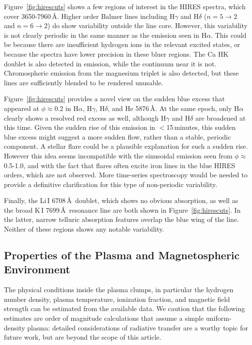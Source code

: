 \documentclass{nature3}
\begin{document}
\begin{methods}
Figure~\ref{fig:hirescuts} shows a few regions of interest in the
HIRES spectra, which cover 3650-7960\,\AA.  Higher order Balmer lines
including H$\gamma$ and H$\delta$ ($n=5\rightarrow2$ and
$n=6\rightarrow2$) do show variability outside the line core.
However, this variability is not clearly periodic in the same manner
as the emission seen in H$\alpha$.  This could be because there are
insufficient hydrogen ions in the relevant excited states, or because
the spectra have lower precision in these bluer regions.  The Ca HK
doublet is also detected in emission, while the continuum near it is
not.  Chromospheric emission from the magnesium triplet is also
detected, but these lines are sufficiently blended to be rendered
unusable.

Figure~\ref{fig:hirescuts} provides a novel view on the sudden blue
excess that appeared at $\phi$$\approx$0.2 in H$\alpha$, H$\gamma$,
H$\delta$, and He 5876\,\AA.  At the same epoch, only H$\alpha$
clearly shows a resolved red excess as well, although H$\gamma$ and
H$\delta$ are broadened at this time.  Given the sudden rise of this
emission in $<$15\,minutes, this sudden blue excess might suggest a
more sudden flow, rather than a stable, periodic component.  A stellar
flare could be a plausible explanation for such a sudden rise.
However this idea seems incompatible with the sinusoidal emission seen
from $\phi$$\approx$0.5-1.0, and with the fact that flares often
excite iron lines in the blue HIRES orders, which are not observed.
More time-series spectroscopy would be needed to provide a definitive
clarification for this type of non-periodic variability.

Finally, the Li\,\textsc{I} 6708\,\AA\ doublet, which shows no obvious
absorption, as well as the broad K\,\textsc{I} 7699\,\AA\ resonance
line are both shown in Figure~\ref{fig:hirescuts}.  In the latter,
narrow telluric absorption features overlap the blue wing of the line.
Neither of these regions shows any notable variability.


\subsection{Properties of the Plasma and Magnetospheric Environment}\phantom{+}
\label{subsec:gas}

The physical conditions inside the plasma clumps, in particular the
hydrogen number density, plasma temperature, ionization fraction, and
magnetic field strength can be estimated from the available data.
We caution that the following estimates are order of magnitude
calculations that assume a simple uniform-density plasma: detailed
considerations of radiative transfer are a worthy topic for future
work, but are beyond the scope of this article.


\end{methods}
\end{document}
